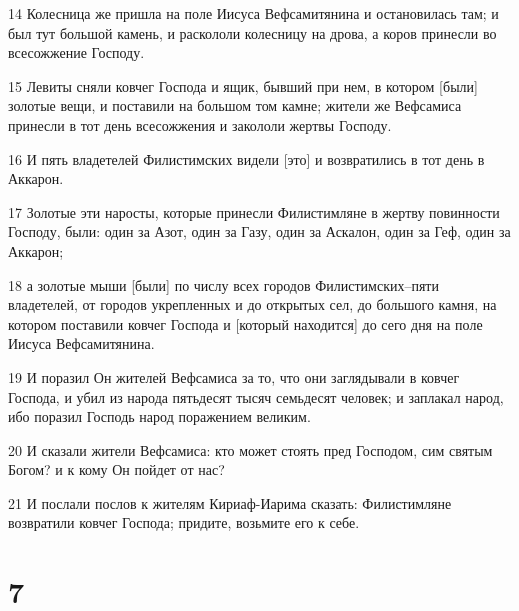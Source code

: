 \par 14 Колесница же пришла на поле Иисуса Вефсамитянина и остановилась там; и был тут большой камень, и раскололи колесницу на дрова, а коров принесли во всесожжение Господу.
\par 15 Левиты сняли ковчег Господа и ящик, бывший при нем, в котором [были] золотые вещи, и поставили на большом том камне; жители же Вефсамиса принесли в тот день всесожжения и закололи жертвы Господу.
\par 16 И пять владетелей Филистимских видели [это] и возвратились в тот день в Аккарон.
\par 17 Золотые эти наросты, которые принесли Филистимляне в жертву повинности Господу, были: один за Азот, один за Газу, один за Аскалон, один за Геф, один за Аккарон;
\par 18 а золотые мыши [были] по числу всех городов Филистимских--пяти владетелей, от городов укрепленных и до открытых сел, до большого камня, на котором поставили ковчег Господа и [который находится] до сего дня на поле Иисуса Вефсамитянина.
\par 19 И поразил Он жителей Вефсамиса за то, что они заглядывали в ковчег Господа, и убил из народа пятьдесят тысяч семьдесят человек; и заплакал народ, ибо поразил Господь народ поражением великим.
\par 20 И сказали жители Вефсамиса: кто может стоять пред Господом, сим святым Богом? и к кому Он пойдет от нас?
\par 21 И послали послов к жителям Кириаф-Иарима сказать: Филистимляне возвратили ковчег Господа; придите, возьмите его к себе.

\chapter{7}

